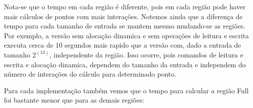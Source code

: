 \documentclass[12pt]{article}
\begin{document}
Nota-se que o tempo em cada região é diferente, pois em cada região pode haver mais cálculos de pontos com mais interações. Notemos ainda que a diferença de tempo para cada tamanho de entrada se mantem mesmo mudando-se as regiões. Por exemplo, a versão sem alocação dinamica e sem operações de leitura e escrita executa cerca de 10 segundos mais rapido que a versão com, dado a entrada de tamanho $2^(13)$, independente da região. Isso ocorre, pois comandos de leitura e escrita e alocação dinamica, dependem do tamanho da entrada e independem do número de interações do cálculo para determinado ponto.

Para cada implementação também vemos que o tempo para calcular a região Full foi bastante menor que para as demais regiões:

\begin{figure}[H]
\end{figure}

\begin{figure}[H]
\end{figure}
\end{document}
